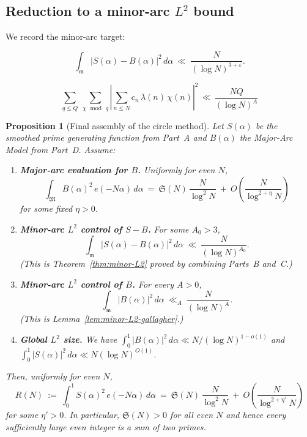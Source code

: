 \documentclass[11pt]{article}
\newtheorem{proposition}[lemma]{Proposition}
\theoremstyle{definition}
\theoremstyle{remark}
\numberwithin{equation}{part}
\begin{document}
\subsection*{Reduction to a minor-arc \texorpdfstring{$L^2$}{L-2} bound}

We record the minor-arc target:

\begin{equation}\label{eq:A1}
	\int_{\mathfrak m}|S(\alpha)-B(\alpha)|^2\,d\alpha\ \ll\ \frac{N}{(\log N)^{3+\varepsilon}}.
\end{equation}

\begin{equation}\label{eq:char-second-moment}\sum_{q\le Q}\ \sum_{\chi\,\bmod\, q}\left|\sum_{n\le N} c_n\,\lambda(n)\,\chi(n)\right|^{2}\,\ll\, \frac{NQ}{(\log N)^A}\end{equation}
\begin{proposition}[Final assembly of the circle method]
	\label{prop:reduction}
	Let $S(\alpha)$ be the smoothed prime generating function from Part~A and $B(\alpha)$ the Major-Arc Model from Part~D. Assume:

	\begin{enumerate}[label=(H\arabic*)]
		\item\label{H1} \textbf{Major-arc evaluation for $B$.} Uniformly for even $N$,
		      \[
			      \int_{\mathfrak M} B(\alpha)^2\,e(-N\alpha)\,d\alpha
			      \ =\ \mathfrak S(N)\,\frac{N}{\log^2 N}\ +\ O\!\left(\frac{N}{\log^{2+\eta}N}\right)
		      \]
		      for some fixed $\eta>0$.
		\item\label{H2} \textbf{Minor-arc $L^2$ control of $S-B$.}
		      For some $A_0>3$,
		      \[
			      \int_{\mathfrak m}\!|S(\alpha)-B(\alpha)|^2\,d\alpha\ \ll\ \frac{N}{(\log N)^{A_0}}.
		      \]
		      (This is Theorem~\ref{thm:minor-L2} proved by combining Parts~B and~C.)
		\item\label{H3} \textbf{Minor-arc $L^2$ control of $B$.} For every $A>0$,
		      \[
			      \int_{\mathfrak m}\!|B(\alpha)|^2\,d\alpha\ \ll_A\ \frac{N}{(\log N)^A}.
		      \]
		      (This is Lemma~\ref{lem:minor-L2-gallagher}.)
		\item\label{H4} \textbf{Global $L^2$ size.} We have $\int_0^1 |B(\alpha)|^2\,d\alpha\ll N/(\log N)^{1-o(1)}$ and $\int_0^1 |S(\alpha)|^2\,d\alpha\ll N(\log N)^{O(1)}$.
	\end{enumerate}
	Then, uniformly for even $N$,
	\[
		R(N)\ :=\ \int_0^1 S(\alpha)^2\,e(-N\alpha)\,d\alpha
		\ =\ \mathfrak S(N)\,\frac{N}{\log^2 N}\ +\ O\!\left(\frac{N}{\log^{2+\eta'}N}\right)
	\]
	for some $\eta'>0$. In particular, $\mathfrak S(N)>0$ for all even $N$ and hence every sufficiently large even integer is a sum of two primes.
\end{proposition}
\end{document}
